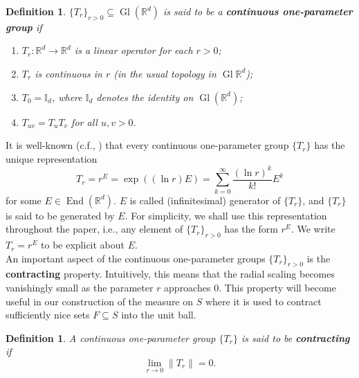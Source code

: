 \documentclass[11pt, letter]{book}
\newtheorem{definition}[theorem]{Definition}
\newcommand\End{\operatorname{End}} %
\newcommand\Gl{\operatorname{Gl}} %
\begin{document}
\begin{framed}
\begin{definition}\label{def:cont_one_param_group}
$\{T_r \}_{r>0} \subseteq \Gl{(\mathbb{R}^d)}$ is said to be a \textbf{continuous one-parameter group} if
\begin{enumerate}
    \item $T_r : \mathbb{R}^d \to \mathbb{R}^d$ is a linear operator for each $r>0$;
    \item $T_r$ is continuous in $r$ (in the usual topology in $\Gl{\mathbb{R}^d}$);    
    \item $T_0 = \mathbb{I}_d$, where $\mathbb{I}_d$ denotes the identity on $\Gl{(\mathbb{R}^d)}$;
    \item $T_{uv} = T_u T_v$ for all $u,v >0$. 
\end{enumerate}
\end{definition}
\end{framed}
\noindent It is well-known (c.f., \cite{randles_convolution_2017,engel_one-parameter_2000,engel_short_2006}) that every continuous one-parameter group $\{T_r\}$ has the unique representation
\begin{equation*}
T_r=r^E=\exp((\ln r) E)=\sum_{k=0}^\infty \frac{(\ln r)^k}{k!}E^k
\end{equation*}
for some $E\in\End(\mathbb{R}^d)$. $E$ is called (infinitesimal) generator of $\{T_r\}$, and $\{T_r\}$ is said to be generated by $E$. For simplicity, we shall use this representation throughout the paper, i.e., any element of $\{T_r \}_{r>0}$ has the form $r^E$. We write $T_r= r^E$ to be explicit about $E$.\\

\noindent An important aspect of the continuous one-parameter groups $\{T_r \}_{r>0}$ is the \textbf{contracting} property. Intuitively, this means that the radial scaling becomes vanishingly small as the parameter $r$ approaches $0$. This property will become useful in our construction of the measure on $S$ where it is used to contract sufficiently nice sets $F\subseteq S$ into the unit ball.
\begin{framed}
\begin{definition} \label{def:contracting_group} A continuous one-parameter group $\{T_r\}$ is said to be \textbf{contracting} if
\begin{equation*}
\lim_{r\to 0}\|T_r\|=0. 
\end{equation*}
\end{definition}
\end{framed}
\end{document}
